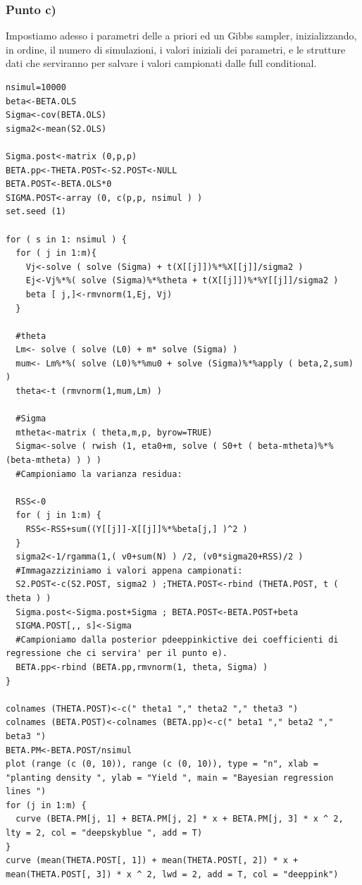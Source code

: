 \subsubsection*{Punto c)}
Impostiamo adesso i parametri delle a priori ed un Gibbs sampler, inizializ\-zando, in ordine, il numero di simulazioni, i valori iniziali dei parametri, e le strutture dati che serviranno per salvare i valori campionati dalle full conditional.
\begin{lstlisting}[style=R]
nsimul=10000
beta<-BETA.OLS
Sigma<-cov(BETA.OLS)
sigma2<-mean(S2.OLS)

Sigma.post<-matrix (0,p,p)
BETA.pp<-THETA.POST<-S2.POST<-NULL
BETA.POST<-BETA.OLS*0
SIGMA.POST<-array (0, c(p,p, nsimul ) )
set.seed (1)

for ( s in 1: nsimul ) {
  for ( j in 1:m){
    Vj<-solve ( solve (Sigma) + t(X[[j]])%*%X[[j]]/sigma2 )
    Ej<-Vj%*%( solve (Sigma)%*%theta + t(X[[j]])%*%Y[[j]]/sigma2 )
    beta [ j,]<-rmvnorm(1,Ej, Vj)
  }
  
  #theta 
  Lm<- solve ( solve (L0) + m* solve (Sigma) )
  mum<- Lm%*%( solve (L0)%*%mu0 + solve (Sigma)%*%apply ( beta,2,sum) )
  theta<-t (rmvnorm(1,mum,Lm) )
  
  #Sigma
  mtheta<-matrix ( theta,m,p, byrow=TRUE)
  Sigma<-solve ( rwish (1, eta0+m, solve ( S0+t ( beta-mtheta)%*%(beta-mtheta) ) ) )
  #Campioniamo la varianza residua:
  
  RSS<-0
  for ( j in 1:m) {
    RSS<-RSS+sum((Y[[j]]-X[[j]]%*%beta[j,] )^2 )
  }
  sigma2<-1/rgamma(1,( v0+sum(N) ) /2, (v0*sigma20+RSS)/2 )
  #Immagazziziniamo i valori appena campionati:
  S2.POST<-c(S2.POST, sigma2 ) ;THETA.POST<-rbind (THETA.POST, t ( theta ) )
  Sigma.post<-Sigma.post+Sigma ; BETA.POST<-BETA.POST+beta
  SIGMA.POST[,, s]<-Sigma
  #Campioniamo dalla posterior pdeeppinkictive dei coefficienti di regressione che ci servira' per il punto e).
  BETA.pp<-rbind (BETA.pp,rmvnorm(1, theta, Sigma) )
}

colnames (THETA.POST)<-c(" theta1 "," theta2 "," theta3 ")
colnames (BETA.POST)<-colnames (BETA.pp)<-c(" beta1 "," beta2 "," beta3 ")
BETA.PM<-BETA.POST/nsimul
plot (range (c (0, 10)), range (c (0, 10)), type = "n", xlab = "planting density ", ylab = "Yield ", main = "Bayesian regression lines ")
for (j in 1:m) {
  curve (BETA.PM[j, 1] + BETA.PM[j, 2] * x + BETA.PM[j, 3] * x ^ 2, lty = 2, col = "deepskyblue ", add = T)
}
curve (mean(THETA.POST[, 1]) + mean(THETA.POST[, 2]) * x + mean(THETA.POST[, 3]) * x ^ 2, lwd = 2, add = T, col = "deeppink")
\end{lstlisting}
